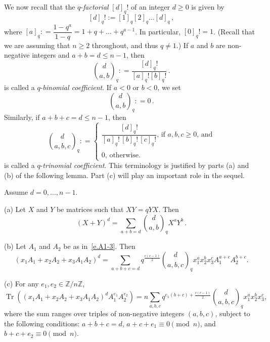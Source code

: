 \documentclass[12pt]{amsart}
\numberwithin{equation}{section}
\numberwithin{subsection}{section}
\theoremstyle{definition} \newtheorem{definition}[theorem]{Definition}
\newcommand\bbZ{\mathbb{Z}}
\newcommand{\tr}{\operatorname{Tr}}
\begin{document}
We now recall that the $q$-{\em factorial} $[d]_q!$ of 
an integer $d \geqslant 0$ is given by
\[ [d]_q ! := [1]_q [2]_q \dots [d]_q \, , \]
where $[a]_q : = \dfrac{1 - q^a}{1 - q} = 1 + q + \dots + q^{a-1}$.
In particular, $[0]_q ! = 1$. (Recall that we are assuming that 
$n \geqslant 2$ throughout, and thus $q \neq 1$.)
If $a$ and $b$ are non-negative integers and $a + b = d \leqslant n-1$, then 
\begin{equation} \label{e.q-binomial}
\binom{d}{a, b}_q : = \frac{[d]_q !}{[a]_q ! [b]_q !} \, . 
\end{equation}
is called a $q$-{\em binomial coefficient}.  If $a < 0$ or $b < 0$, we set
\[ \binom{d}{a, b}_q : = 0 \, . 
\]
Similarly, if $a + b + c = d \leqslant n-1$, then
\begin{equation} \label{e.q-trinomial}
\binom{d}{a, b, c}_q : = \begin{cases}
\text{{$\dfrac{[d]_q !}{[a]_q ! \,  [b]_q ! \,  [c]_q !}$}, 
if $a, b, c \geqslant 0$, and} \\
 \\
\text{$0$, otherwise.}
\end{cases} 
\end{equation}
is called a $q$-{\em trinomial coefficient}. This terminology is justified by
parts (a) and (b) of the following lemma. Part (c) will play an important role
in the sequel.

\begin{lemma} \label{lem.binomial} Assume $d = 0, \dots, n-1$. 

\smallskip
(a) Let $X$ and $Y$ be matrices such that $XY = q YX$. Then
\[ (X + Y)^d = \sum_{a + b = d} 
\binom{d}{a, b}_q X^a Y^b  \, . \]

\smallskip
(b) Let $A_1$ and $A_2$ be as in~\eqref{e.A1-3}. Then 
\[ (x_1 A_1 + x_2 A_2 + x_3 A_1 A_2)^d = 
\sum_{ a + b + c = d}
q^{\frac{c(c-1)}{2}} 
\binom{d}{a, b, c}_q 
x_1^a x_2^b x_3^c 
A_1^{a + c} A_2^{b + c}. \] 

\smallskip
(c) For any $e_1, e_2 \in \bbZ/n \bbZ$, 
\[ \tr((x_1 A_1 + x_2 A_2 + x_3 A_1 A_2)^d A_1^{e_1} A_2^{e_2}) =
n \sum_{a, b, c}
q^{e_1(b+c) + \frac{c(c-1)}{2}} 
\binom{d}{a, b, c}_q 
x_1^a x_2^b x_3^c , \]
where the sum ranges over triples of non-negative integers $(a, b, c)$, subject
to the following conditions:
$a + b + c = d$, 
$a + c +  e_1 \equiv 0 \pmod{n}$, and 
$b + c + e_2 \equiv 0 \pmod{n}$.
\end{lemma}
\end{document}
